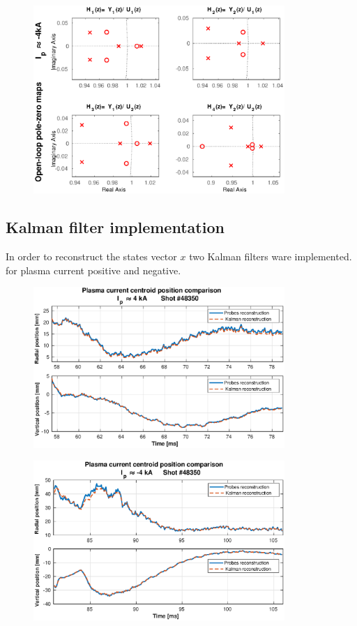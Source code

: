 \begin{figure}
	\centering
	\includegraphics[width=0.85\textwidth]{Chp5/PoleZero/PoleZeroOpenNegZoom.eps}
	\label{PoleZeroOpenNegZoom}
\end{figure}


\subsection{Kalman filter implementation}
In order to reconstruct the states vector $x$ two Kalman filters ware implemented.  for plasma current positive and negative.\smallskip
\begin{figure}
	\centering
	\includegraphics[width=0.85\textwidth]{Chp5/Kalman_comp_pos.eps}
	\caption{\label{Kalman_pos}}
\end{figure}

\begin{figure}
	\centering
	\includegraphics[width=0.85\textwidth]{Chp5/Kalman_comp_neg.eps}
	\caption{\label{Kalman_neg}}
\end{figure}

